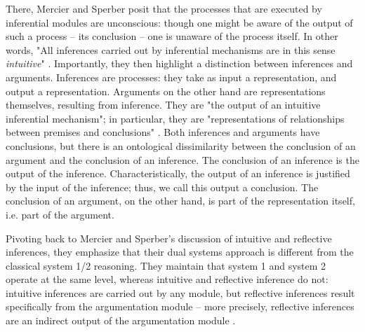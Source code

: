 There, Mercier and Sperber posit that the processes that are executed by inferential modules are unconscious: though one might be aware of the output of such a process -- its conclusion -- one is unaware of the process itself. In other words, "All inferences carried out by inferential mechanisms are in this sense \emph{intuitive}" \citep[p.~58]{MS11}.
Importantly, they then highlight a distinction between inferences and arguments.
Inferences are processes: they take as input a representation, and output a representation.
Arguments on the other hand are representations themselves, resulting from inference. They are "the output of an intuitive inferential mechanism"; in particular, they are "representations of relationships between premises and conclusions" \citep[p.~58]{MS11}.
Both inferences and arguments have conclusions, but there is an ontological dissimilarity between the conclusion of an argument and the conclusion of an inference.
The conclusion of an inference is the output of the inference. Characteristically, the output of an inference is justified by the input of the inference; thus, we call this output a conclusion.
The conclusion of an argument, on the other hand, is part of the representation itself, i.e. part of the argument.

Pivoting back to Mercier and Sperber's \citeyear{MS09} discussion of intuitive and reflective inferences, they emphasize that their dual systems approach is different from the classical system 1/2 reasoning. They maintain that system 1 and system 2 operate at the same level, whereas intuitive and reflective inference do not: intuitive inferences are carried out by any module, but reflective inferences result specifically from the argumentation module -- more precisely, reflective inferences are an indirect output of the argumentation module \citep[p.~156]{MS09}.

